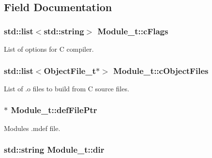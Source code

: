 \subsection{Field Documentation}
\subsubsection[{\texorpdfstring{c\+Flags}{cFlags}}]{\setlength{\rightskip}{0pt plus 5cm}std\+::list$<$std\+::string$>$ Module\+\_\+t\+::c\+Flags}\hypertarget{struct_module__t_a6b5e2ce435023523cc589d78805a2922}{}\label{struct_module__t_a6b5e2ce435023523cc589d78805a2922}


List of options for C compiler. 

\subsubsection[{\texorpdfstring{c\+Object\+Files}{cObjectFiles}}]{\setlength{\rightskip}{0pt plus 5cm}std\+::list$<${\bf Object\+File\+\_\+t}$\ast$$>$ Module\+\_\+t\+::c\+Object\+Files}\hypertarget{struct_module__t_a548a3f3c5215fa22c006d87dc0d11231}{}\label{struct_module__t_a548a3f3c5215fa22c006d87dc0d11231}


List of .o files to build from C source files. 

\subsubsection[{\texorpdfstring{def\+File\+Ptr}{defFilePtr}}]{$\ast$ Module\+\_\+t\+::def\+File\+Ptr}\hypertarget{struct_module__t_a0a0295117c585f8a8b8aef6b5cb29943}{}\label{struct_module__t_a0a0295117c585f8a8b8aef6b5cb29943}


Module\textquotesingle{}s .mdef file. 

\subsubsection[{\texorpdfstring{dir}{dir}}]{\setlength{\rightskip}{0pt plus 5cm}std\+::string Module\+\_\+t\+::dir}\hypertarget{struct_module__t_a6c289cc21b1976483d35179bb073da74}{}\label{struct_module__t_a6c289cc21b1976483d35179bb073da74}


